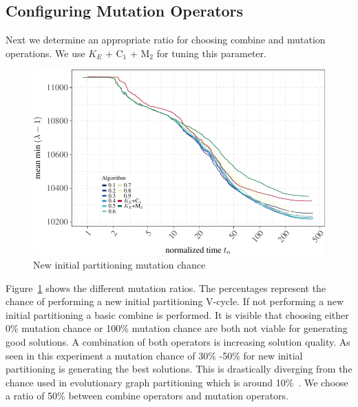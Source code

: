 \documentclass[a4paper,12pt,titlepage, BCOR7mm,headsepline]{scrbook}
\numberwithin{equation}{section}
\begin{document}
\subsection{Configuring Mutation Operators}
Next we determine an appropriate ratio for choosing combine and mutation operations. We use $K_E$ + C$_1$ + M$_2$ for tuning this parameter.%

\begin{figure}[H]

\begin{center}
\includegraphics{rnw/tuning_subset_plots/mutation_tuning_plot-1}\caption{New initial partitioning mutation chance}\label{fig:mutationchancetuning}
\end{center}

\end{figure}
Figure~\ref{fig:mutationchancetuning} shows the different mutation ratios. The percentages represent the chance of performing a new initial partitioning V-cycle. If not performing a new initial partitioning a basic combine is performed. It is visible that choosing either 0\% mutation chance or 100\% mutation chance are both not viable for generating good solutions. A combination of both operators is increasing solution quality. As seen in this experiment a mutation chance of 30\% -50\% for new initial partitioning is generating the best solutions. This is drastically diverging from the chance used in evolutionary graph partitioning which is around 10\%~\cite{sanders2012distributed}. We choose a ratio of 50\% between combine operators and mutation operators. 
\end{document}
